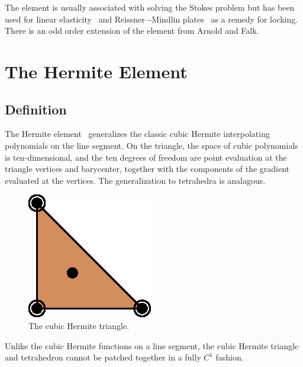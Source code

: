 
The element is usually associated with solving the Stokes problem but
has been used for linear elasticity~\cite{HansboLarson2003} and
Reissner–-Mindlin plates~\cite{ArnoldFalk1989} as a remedy for
locking. There is an odd order extension of the element from Arnold
and Falk.


\newpage

\section{The Hermite Element}

\subsection{Definition}

The Hermite element~\cite{Ciarlet2002} generalizes the classic cubic
Hermite interpolating polynomials on the line segment. On the
triangle, the space of cubic polynomials is ten-dimensional, and the
ten degrees of freedom are point evaluation at the triangle vertices
and barycenter, together with the components of the gradient evaluated
at the vertices. The generalization to tetrahedra is analagous.

\begin{figure}[H]
  \begin{center}
    \includegraphics[width=\smallwidth]{chapters/kirby-6/eps/HER3.eps}
    \caption{The cubic Hermite triangle.}
  \end{center}
\end{figure}

Unlike the cubic Hermite functions on a line segment, the cubic
Hermite triangle and tetrahedron cannot be patched together in a fully
\( C^1 \) fashion.

